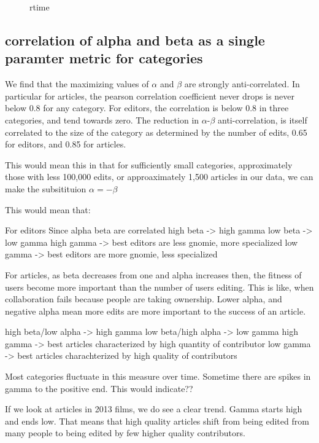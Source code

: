 \documentclass{acm_proc_article-sp}
\begin{document}
\begin{figure}[!t]
\centering
\caption{rtime}
\label{fig:rtime}
\end{figure}

\subsection{correlation of alpha and beta as a single paramter metric for categories}


We find that the maximizing values of $\alpha$ and $\beta$ are strongly anti-correlated. In particular for articles, the pearson correlation coefficient never drops is never below 0.8 for any category. For editors, the correlation is below 0.8 in three categories, and tend towards zero. The reduction in $\alpha$-$\beta$ anti-correlation, is itself correlated to the size of the category as determined by the number of edits, 0.65 for editors, and 0.85 for articles. 

This would mean this in that for sufficiently small categories, approximately those with less  100,000 edits, or approaximately 1,500 articles in our data, we can make the subsitituion $\alpha = - \beta$


This would mean that:

For editors
Since alpha beta are correlated 
high beta -> high gamma
low beta -> low gamma
high gamma -> best editors are less gnomie, more specialized
low gamma -> best editors are more gnomie, less specialized


For articles, as beta decreases from one and alpha increases then, the fitness of users become more important than the number of users editing. This is like, when collaboration fails because people are taking ownership. Lower alpha, and negative alpha mean more edits are more important to the success of an article.

high beta/low alpha -> high gamma
low beta/high alpha -> low gamma
high gamma -> best articles characterized by high quantity of contributor
low gamma -> best articles charachterized by high quality of contributors


Most categories fluctuate in this measure over time. Sometime there are spikes in gamma to the positive end. This would indicate??

If we look at articles in 2013 films, we do see a clear trend. Gamma starts high and ends low. That means that high quality articles shift from being edited from many people to being edited by few higher quality contributors.
\end{document}

